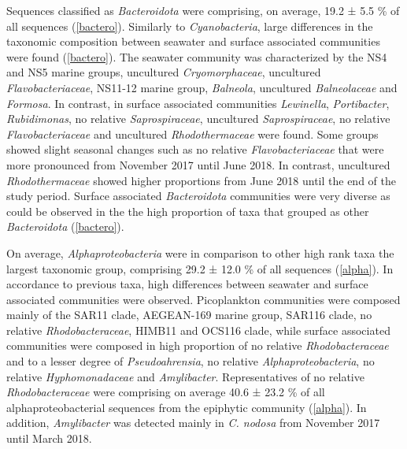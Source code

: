 \documentclass[12pt,]{article}
\begin{document}
Sequences classified as \emph{Bacteroidota} were comprising, on average,
19.2 ± 5.5 \si{\percent} of all sequences (\autoref{bactero}). Similarly
to \emph{Cyanobacteria}, large differences in the taxonomic composition
between seawater and surface associated communities were found
(\autoref{bactero}). The seawater community was characterized by the NS4
and NS5 marine groups, uncultured \emph{Cryomorphaceae}, uncultured
\emph{Flavobacteriaceae}, NS11-12 marine group, \emph{Balneola},
uncultured \emph{Balneolaceae} and \emph{Formosa}. In contrast, in
surface associated communities \emph{Lewinella}, \emph{Portibacter},
\emph{Rubidimonas}, no relative \emph{Saprospiraceae}, uncultured
\emph{Saprospiraceae}, no relative \emph{Flavobacteriaceae} and
uncultured \emph{Rhodothermaceae} were found. Some groups showed slight
seasonal changes such as no relative \emph{Flavobacteriaceae} that were
more pronounced from November 2017 until June 2018. In contrast,
uncultured \emph{Rhodothermaceae} showed higher proportions from June
2018 until the end of the study period. Surface associated
\emph{Bacteroidota} communities were very diverse as could be observed
in the the high proportion of taxa that grouped as other
\emph{Bacteroidota} (\autoref{bactero}).

On average, \emph{Alphaproteobacteria} were in comparison to other high
rank taxa the largest taxonomic group, comprising 29.2 ± 12.0
\si{\percent} of all sequences (\autoref{alpha}). In accordance to
previous taxa, high differences between seawater and surface associated
communities were observed. Picoplankton communities were composed mainly
of the SAR11 clade, AEGEAN-169 marine group, SAR116 clade, no relative
\emph{Rhodobacteraceae}, HIMB11 and OCS116 clade, while surface
associated communities were composed in high proportion of no relative
\emph{Rhodobacteraceae} and to a lesser degree of \emph{Pseudoahrensia},
no relative \emph{Alphaproteobacteria}, no relative
\emph{Hyphomonadaceae} and \emph{Amylibacter}. Representatives of no
relative \emph{Rhodobacteraceae} were comprising on average 40.6 ± 23.2
\si{\percent} of all alphaproteobacterial sequences from the epiphytic
community (\autoref{alpha}). In addition, \emph{Amylibacter} was
detected mainly in \emph{C. nodosa} from November 2017 until March 2018.
\end{document}
